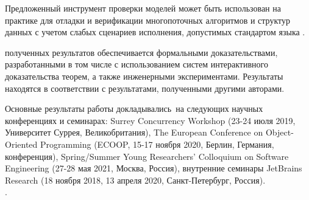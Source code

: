 Предложенный инструмент проверки моделей может быть использован на практике
для отладки и верификации многопоточных алгоритмов и структур данных 
с учетом слабых сценариев исполнения, допустимых стандартом языка \CLANG. 

{\reliability} полученных результатов обеспечивается 
формальными доказательствами, разработанными в том числе с использованием
систем интерактивного доказательства теорем, 
а также инженерными экспериментами. 
Результаты находятся в соответствии с результатами, полученными другими авторами.

{\probation} Основные результаты работы докладывались~на
следующих научных конференциях и семинарах:
Surrey Concurrency Workshop (23-24 июля 2019, Университет Суррея, Великобритания),
The European Conference on Object-Oriented Programming
(ECOOP, 15-17 ноября 2020, Берлин, Германия, конференция),
Spring/Summer Young Researchers' Colloquium on Software Engineering
(27-28 мая 2021, Москва, Россия),
внутренние семинары JetBrains Research
(18 ноября 2018, 13 апреля 2020, Санкт-Петербург, Россия). \\
.


